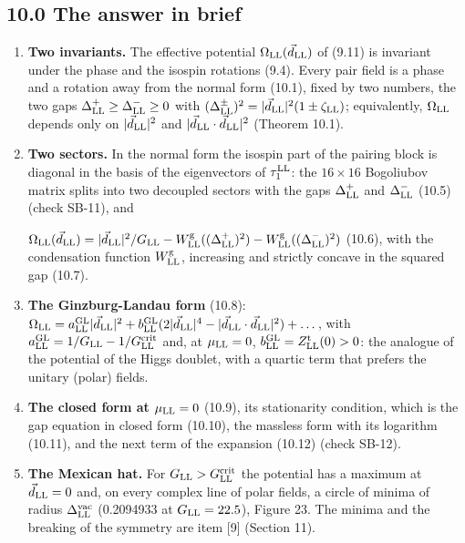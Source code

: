 \documentclass[
  10pt,
]{article}
\begin{document}
\hypertarget{the-answer-in-brief-8}{%
\subsection{10.0 The answer in brief}\label{the-answer-in-brief-8}}

\begin{enumerate}
\def\labelenumi{\arabic{enumi}.}
\item
  \textbf{Two invariants.} The effective potential
  \(\Omega_{\rm LL}(\vec d_{\rm LL})\) of (9.11) is invariant under the
  phase and the isospin rotations (9.4). Every pair field is a phase and
  a rotation away from the normal form (10.1), fixed by two numbers, the
  two gaps \(\Delta^+_{\rm LL}\ge\Delta^-_{\rm LL}\ge0\) with
  \((\Delta^\pm_{\rm LL})^2=\lvert\vec d_{\rm LL}\rvert^2(1\pm\zeta_{\rm LL})\);
  equivalently, \(\Omega_{\rm LL}\) depends only on
  \(\lvert\vec d_{\rm LL}\rvert^2\) and
  \(\lvert\vec d_{\rm LL}\cdot\vec d_{\rm LL}\rvert^2\) (Theorem 10.1).
\item
  \textbf{Two sectors.} In the normal form the isospin part of the
  pairing block is diagonal in the basis of the eigenvectors of
  \(\tau^{\rm LL}_1\): the \(16\times16\) Bogoliubov matrix splits into
  two decoupled sectors with the gaps \(\Delta^+_{\rm LL}\) and
  \(\Delta^-_{\rm LL}\) (10.5) (check SB-11), and

  \(\Omega_{\rm LL}(\vec d_{\rm LL})=\lvert\vec d_{\rm LL}\rvert^2/G_{\rm LL}-W^{\rm g}_{\rm LL}((\Delta^+_{\rm LL})^2)-W^{\rm g}_{\rm LL}((\Delta^-_{\rm LL})^2)\)
  (10.6), with the condensation function \(W^{\rm g}_{\rm LL}\),
  increasing and strictly concave in the squared gap (10.7).
\item
  \textbf{The Ginzburg-Landau form} (10.8):
  \(\Omega_{\rm LL}=a^{\rm GL}_{\rm LL}\lvert\vec d_{\rm LL}\rvert^2+b^{\rm GL}_{\rm LL}(2\lvert\vec d_{\rm LL}\rvert^4-\lvert\vec d_{\rm LL}\cdot\vec d_{\rm LL}\rvert^2)+\dots\),
  with \(a^{\rm GL}_{\rm LL}=1/G_{\rm LL}-1/G^{\rm crit}_{\rm LL}\) and,
  at \(\mu_{\rm LL}=0\),
  \(b^{\rm GL}_{\rm LL}=Z^{\rm t}_{\rm LL}(0)>0\): the analogue of the
  potential of the Higgs doublet, with a quartic term that prefers the
  unitary (polar) fields.
\item
  \textbf{The closed form at \(\mu_{\rm LL}=0\)} (10.9), its
  stationarity condition, which is the gap equation in closed form
  (10.10), the massless form with its logarithm (10.11), and the next
  term of the expansion (10.12) (check SB-12).
\item
  \textbf{The Mexican hat.} For \(G_{\rm LL}>G^{\rm crit}_{\rm LL}\) the
  potential has a maximum at \(\vec d_{\rm LL}=0\) and, on every complex
  line of polar fields, a circle of minima of radius
  \(\Delta^{\rm vac}_{\rm LL}\) (0.2094933 at \(G_{\rm LL}=22.5\)),
  Figure 23. The minima and the breaking of the symmetry are item
  {[}9{]} (Section 11).
\end{enumerate}
\end{document}

